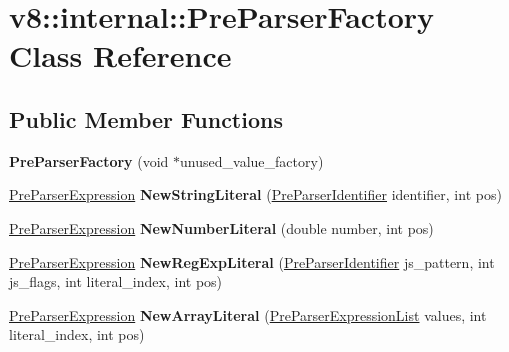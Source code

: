 \hypertarget{classv8_1_1internal_1_1_pre_parser_factory}{}\section{v8\+:\+:internal\+:\+:Pre\+Parser\+Factory Class Reference}
\label{classv8_1_1internal_1_1_pre_parser_factory}
\subsection*{Public Member Functions}
\begin{DoxyCompactItemize}
\item 
{\bfseries Pre\+Parser\+Factory} (void $\ast$unused\+\_\+value\+\_\+factory)\hypertarget{classv8_1_1internal_1_1_pre_parser_factory_a4362aad7c47225ea2ab8938c3dbea9e2}{}\label{classv8_1_1internal_1_1_pre_parser_factory_a4362aad7c47225ea2ab8938c3dbea9e2}

\item 
\hyperlink{classv8_1_1internal_1_1_pre_parser_expression}{Pre\+Parser\+Expression} {\bfseries New\+String\+Literal} (\hyperlink{classv8_1_1internal_1_1_pre_parser_identifier}{Pre\+Parser\+Identifier} identifier, int pos)\hypertarget{classv8_1_1internal_1_1_pre_parser_factory_a9486b090ca9c8d6039ed817d181c8ba6}{}\label{classv8_1_1internal_1_1_pre_parser_factory_a9486b090ca9c8d6039ed817d181c8ba6}

\item 
\hyperlink{classv8_1_1internal_1_1_pre_parser_expression}{Pre\+Parser\+Expression} {\bfseries New\+Number\+Literal} (double number, int pos)\hypertarget{classv8_1_1internal_1_1_pre_parser_factory_a5549d27a221f2bf8abb9b3a6df4d08e7}{}\label{classv8_1_1internal_1_1_pre_parser_factory_a5549d27a221f2bf8abb9b3a6df4d08e7}

\item 
\hyperlink{classv8_1_1internal_1_1_pre_parser_expression}{Pre\+Parser\+Expression} {\bfseries New\+Reg\+Exp\+Literal} (\hyperlink{classv8_1_1internal_1_1_pre_parser_identifier}{Pre\+Parser\+Identifier} js\+\_\+pattern, int js\+\_\+flags, int literal\+\_\+index, int pos)\hypertarget{classv8_1_1internal_1_1_pre_parser_factory_a6229649b9b14190c1b2b4e6324fb1955}{}\label{classv8_1_1internal_1_1_pre_parser_factory_a6229649b9b14190c1b2b4e6324fb1955}

\item 
\hyperlink{classv8_1_1internal_1_1_pre_parser_expression}{Pre\+Parser\+Expression} {\bfseries New\+Array\+Literal} (\hyperlink{classv8_1_1internal_1_1_pre_parser_list}{Pre\+Parser\+Expression\+List} values, int literal\+\_\+index, int pos)\hypertarget{classv8_1_1internal_1_1_pre_parser_factory_ae2b4613a227c5e5c8dd9a79da4425131}{}\label{classv8_1_1internal_1_1_pre_parser_factory_ae2b4613a227c5e5c8dd9a79da4425131}


\end{DoxyCompactItemize}
